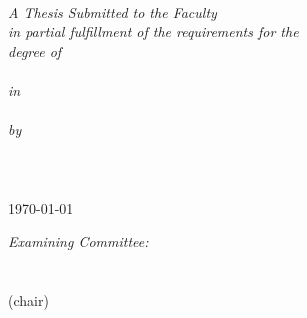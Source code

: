 
\begin{titlepage}
\begin{center}

\HRule \\[0.5cm] %

{\large \bfseries \ttitle} %
\HRule %
\linespread{1.1} \\~\\[0.2cm]
  \textit{A Thesis Submitted to the Faculty\\in partial fulfillment of the requirements for the\\ degree of\\ \degreename}\\[0.2cm] %
\textit{in}\\[0.3cm]
\fieldname\\[0.3cm] %
 
\large\emph{by}\\\Large
\textsc{\authornames}\\ %
 \textsc{\large \univname}\\ %
 \normalsize \citystatenames\\
 { \today}\\[2.0 cm] %


\begin{minipage}{1.0\textwidth}
\begin{flushright} \large
\normalsize \emph{Examining Committee:} \\~\\
\underline{\hspace{6cm}}\\\small (chair) \textsc{\commchairname} \\~\\~ \underline{\hspace{6cm}}\\ \small\textsc{\commadvtwoname} \\~\\~ \underline{\hspace{6cm}}\\ \small\textsc{\commadvthreename}  
\end{flushright}
\end{minipage}\\[1cm]


\end{center}
\end{titlepage}
